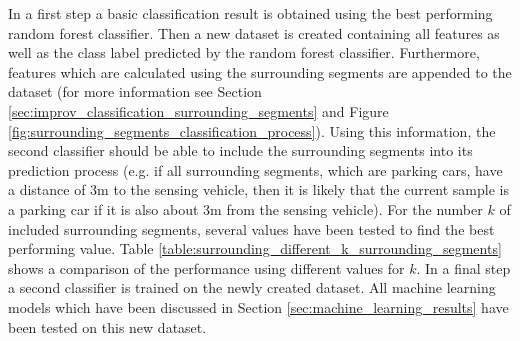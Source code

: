 In a first step a basic classification result is obtained using the best performing random forest classifier.
Then a new dataset is created containing all features as well as the class label predicted by the random forest classifier. 
Furthermore, features which are calculated using the surrounding segments are appended to the dataset (for more information see Section \ref{sec:improv_classification_surrounding_segments} and Figure \ref{fig:surrounding_segments_classification_process}).
 Using this information, the second classifier should be able to include the surrounding segments into its prediction process (e.g. if all surrounding segments, which are parking cars, have a distance of 3m to the sensing vehicle, then it is likely that the current sample is a parking car if it is also about 3m from the sensing vehicle). For the number $k$ of included surrounding segments, several values have been tested to find the best performing value.
Table \ref{table:surrounding_different_k_surrounding_segments} shows a comparison of the performance using different values for $k$.
In a final step a second classifier is trained on the newly created dataset. All machine learning models which have been discussed in Section \ref{sec:machine_learning_results} have been tested on this new dataset.


